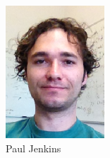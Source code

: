\documentclass[aspectratio=169]{beamer}
\begin{document}
\begin{frame}
\begin{columns}
\begin{column}{0.2\textwidth}
\includegraphics[width=\textwidth]{paul.png}\\
Paul Jenkins
\end{column}
\end{columns}
\end{frame}
\end{document}
